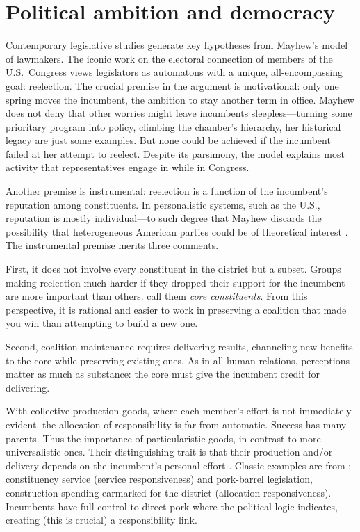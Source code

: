 
\section{Political ambition and democracy}

Contemporary legislative studies generate key hypotheses from Mayhew's \citeyearpar{mayhew.1974} model of lawmakers. The iconic work on the electoral connection of members of the U.S.\ Congress views legislators as automatons with a unique, all-encompassing goal: reelection. The crucial premise in the argument is motivational: only one spring moves the incumbent, the ambition to stay another term in office. Mayhew does not deny that other worries might leave incumbents sleepless---turning some prioritary program into policy, climbing the chamber's hierarchy, her historical legacy are just some examples. But none could be achieved if the incumbent failed at her attempt to reelect. Despite its parsimony, the model explains most activity that representatives engage in while in Congress. 

Another premise is instrumental: reelection is a function of the incumbent's reputation among constituents. In personalistic systems, such as the U.S., reputation is mostly individual---to such degree that Mayhew discards the possibility that heterogeneous American parties could be of theoretical interest \citep[but revisionists rescued party relevance in Mayhew's framework,][]{cox.mccubbins.2007leviath2nd,aldrich.1995}. The instrumental premise merits three comments. 

First, it does not involve every constituent in the district but a subset. Groups making reelection much harder if they dropped their support for the incumbent are more important than others. \citet{cox.mccubbins.1986} call them \emph{core constituents}. From this perspective, it is rational and easier to work in preserving a coalition that made you win than attempting to build a new one.

Second, coalition maintenance requires delivering results, channeling new benefits to the core while preserving existing ones. As in all human relations, perceptions matter as much as substance: the core must give the incumbent credit for delivering. 

With collective production goods, where each member's effort is not immediately evident, the allocation of responsibility is far from automatic. Success has many parents. Thus the importance of particularistic goods, in contrast to more universalistic ones. Their distinguishing trait is that their production and/or delivery depends on the incumbent's personal effort \citep{haggard.mccubbins.2001}. Classic examples are from \citet{cain.etal.1987}: constituency service (service responsiveness) and pork-barrel legislation, construction spending earmarked for the district (allocation responsiveness). Incumbents have full control to direct pork where the political logic indicates, creating (this is crucial) a responsibility link.

